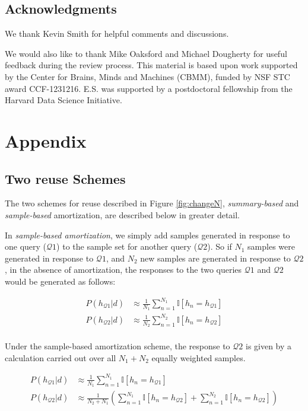 \subsection*{Acknowledgments}

We thank Kevin Smith for helpful comments and discussions. 

We would also like to thank Mike Oaksford and Michael Dougherty for useful feedback during the review process. This material is based upon work supported by the Center for Brains, Minds and Machines (CBMM), funded by NSF STC award CCF-1231216. E.S. was supported by a postdoctoral fellowship from the Harvard Data Science Initiative.


\section*{Appendix}
\subsection*{Two reuse Schemes}
The two schemes for reuse described in Figure \ref{fig:changeN}, \emph{summary-based} and \emph{sample-based} amortization, are described below in greater detail. 


In \emph{sample-based amortization}, we simply add samples generated in response to one query ($\mathcal{Q}1$) to the sample set for another query ($\mathcal{Q}2$). So if $N_1$ samples were generated in response to $\mathcal{Q}1$, and $N_2$ new samples are generated in response to $\mathcal{Q}2$, in the absence of amortization, the responses to the two queries $\mathcal{Q}1$ and $\mathcal{Q}2$ would be generated as follows:

\begin{align*}
\textstyle
P(h_{\mathcal{Q}1}|d) & \approx \frac{1}{N_1}\sum_{n=1}^{N_1} \mathbb{I}[h_n=h_{\mathcal{Q}1}]\\
P(h_{\mathcal{Q}2}|d) & \approx \frac{1}{N_2}\sum_{n=1}^{N_2} \mathbb{I}[h_n=h_{\mathcal{Q}2}]\\
\end{align*}

Under the sample-based amortization scheme, the response to $\mathcal{Q}2$ is given by a calculation carried out over all $N_1 + N_2$ equally weighted samples.

\begin{align*}
\textstyle
P(h_{\mathcal{Q}1}|d) & \approx \frac{1}{N_1}\sum_{n=1}^{N_1} \mathbb{I}[h_n=h_{\mathcal{Q}1}]\\
P(h_{\mathcal{Q}2}|d) & \approx \frac{1}{N_2 + N_1}  \left( \sum_{n=1}^{N_1} \mathbb{I}[h_n=h_{\mathcal{Q}2}] + \sum_{n=1}^{N_2} \mathbb{I}[h_n=h_{\mathcal{Q}2}] \right)\\
\end{align*}

